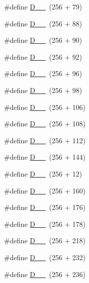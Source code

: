 \begin{DoxyCompactItemize}
\#define \hyperlink{group___d_r_i_v_e_r_s_gae6ba99808ab9bc8eaddbc7c7cc6af1f3}{D\+\_\+\_}~(256 + 79)
\item 
\#define \hyperlink{group___d_r_i_v_e_r_s_ga05bc14cf9653fc7778acfa75c9ac19df}{D\+\_\+\_}~(256 + 88)
\item 
\#define \hyperlink{group___d_r_i_v_e_r_s_ga63bb29a8be69128a60f4716aacc447a8}{D\+\_\+\_}~(256 + 90)
\item 
\#define \hyperlink{group___d_r_i_v_e_r_s_gabd8a1ea9b71ac9389116a33e317aad6c}{D\+\_\+\_}~(256 + 92)
\item 
\#define \hyperlink{group___d_r_i_v_e_r_s_ga9deaa01235044f6470a4269db6b624ea}{D\+\_\+\_}~(256 + 96)
\item 
\#define \hyperlink{group___d_r_i_v_e_r_s_gaa3060f343d69794f21fcb65974c135bd}{D\+\_\+\_}~(256 + 98)
\item 
\#define \hyperlink{group___d_r_i_v_e_r_s_ga1a90f348e71ec52d2ae6af1b56a513e6}{D\+\_\+\_}~(256 + 106)
\item 
\#define \hyperlink{group___d_r_i_v_e_r_s_ga0443e52a615f3203ebc5ca43189bdcb8}{D\+\_\+\_}~(256 + 108)
\item 
\#define \hyperlink{group___d_r_i_v_e_r_s_ga2c149c0691ea56561d9f3cd0f34bb1d9}{D\+\_\+\_}~(256 + 112)
\item 
\#define \hyperlink{group___d_r_i_v_e_r_s_ga782fd500c37614a9a83b50adf3f18a2d}{D\+\_\+\_}~(256 + 144)
\item 
\#define \hyperlink{group___d_r_i_v_e_r_s_ga3248b12d5c7a9f33e19f32da0822ce60}{D\+\_\+\_}~(256 + 12)
\item 
\#define \hyperlink{group___d_r_i_v_e_r_s_ga97169732d7858751120c9b32109f5875}{D\+\_\+\_}~(256 + 160)
\item 
\#define \hyperlink{group___d_r_i_v_e_r_s_gab7a349f836821460da79b4bbcb1089c2}{D\+\_\+\_}~(256 + 176)
\item 
\#define \hyperlink{group___d_r_i_v_e_r_s_ga783f9fddb57c3462c7d4344c46cbec51}{D\+\_\+\_}~(256 + 178)
\item 
\#define \hyperlink{group___d_r_i_v_e_r_s_ga0c4568c70e2cd501e8de6c3147eb0276}{D\+\_\+\_}~(256 + 218)
\item 
\#define \hyperlink{group___d_r_i_v_e_r_s_ga2b58e015c2162382339b7c57607ee32c}{D\+\_\+\_}~(256 + 232)
\item 
\#define \hyperlink{group___d_r_i_v_e_r_s_ga1ac208ac9e1ba17e8b116176c2878068}{D\+\_\+\_}~(256 + 236)
\item 

\end{DoxyCompactItemize}

